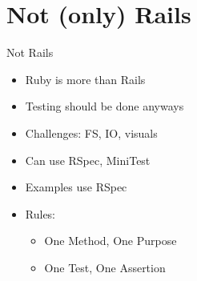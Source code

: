\documentclass[style=paintings,display=slidesnotes,clock]{powerdot}
\begin{document}
\section{Not (only) Rails}
\begin{note}{Not Rails}
	\begin{itemize}
		\item Ruby is more than Rails
		\item Testing should be done anyways
		\item Challenges: FS, IO, visuals
		\item Can use RSpec, MiniTest
		\item Examples use RSpec
		\item Rules:
			\begin{itemize}
				\item One Method, One Purpose
				\item One Test, One Assertion
			\end{itemize}
	\end{itemize}
\end{note}
\end{document}
